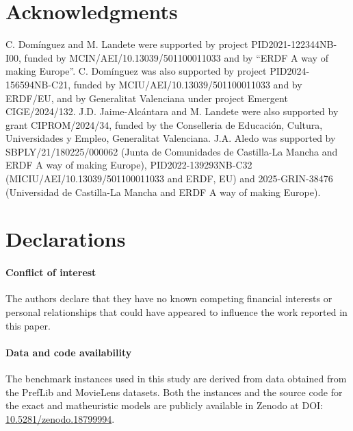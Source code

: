 \documentclass[pdflatex,basic,Numbered]{jnl}%
\theoremstyle{plain}
\theoremstyle{remark}
\theoremstyle{thmstyleone}%
\theoremstyle{thmstylethree}%
\begin{document}
\section*{Acknowledgments}
{\sloppy
C. Domínguez and M. Landete were supported by project PID2021-122344NB-I00, funded by MCIN/AEI/10.13039/501100011033 and by “ERDF A way of making Europe”. C. Domínguez was also supported by project PID2024-156594NB-C21, funded by MCIU/AEI/10.13039/501100011033 and by ERDF/EU, and by Generalitat Valenciana under project Emergent CIGE/2024/132. J.D. Jaime-Alcántara and M. Landete were also supported by grant CIPROM/2024/34, funded by the Conselleria de Educación, Cultura, Universidades y Empleo, Generalitat Valenciana. J.A. Aledo was supported by SBPLY/21/180225/000062 (Junta de Comunidades de Castilla-La Mancha and ERDF A way of making Europe), PID2022-139293NB-C32 (MICIU/AEI/10.13039/501100011033 and ERDF, EU) and 2025-GRIN-38476 (Universidad de Castilla-La Mancha and ERDF A way of making Europe).\par}

\section*{Declarations}

\paragraph{Conflict of interest} 
The authors declare that they have no known competing financial interests or personal relationships that could have appeared to influence the work reported in this paper.

\paragraph{Data and code availability}
The benchmark instances used in this study are derived from data obtained from the PrefLib and MovieLens datasets. Both the instances and the source code for the exact and matheuristic models are publicly available in Zenodo at DOI: \href{https://doi.org/10.5281/zenodo.18799994}{10.5281/zenodo.18799994}.


\end{document}
